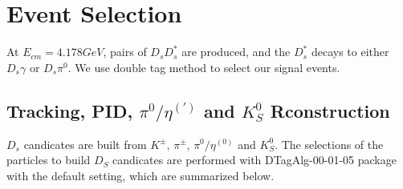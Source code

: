 \section{Event Selection}
At $E_{cm} = 4.178 GeV$, pairs of $D_{s}D_{s}^{*}$ are produced,  and the $D_{s}^{*}$ decays to either $D_{s}\gamma$ or $D_{s}\pi^{0}$.  We use double tag method to select our signal events.


\subsection{Tracking, PID, $\pi^{0}/\eta^{(')}$ and $K_{S}^{0}$ Rconstruction }
$D_{s}$ candicates are built from $K^{\pm}$, $\pi^{\pm}$, $\pi^{0}/\eta^{(0)}$ and $K_{S}^{0}$. The selections of the particles to build $D_{S}$ candicates are performed with DTagAlg-00-01-05 package with the default setting, which are summarized below.

